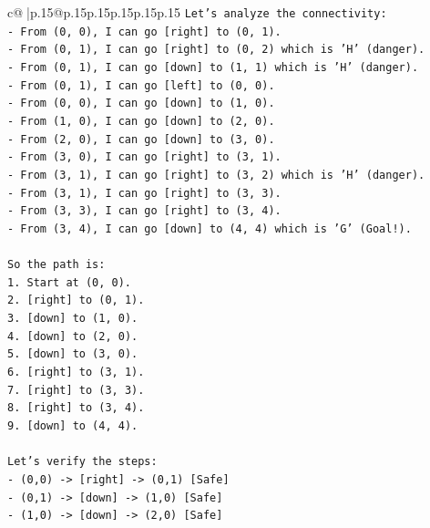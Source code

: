 \documentclass{article}
\begin{document}
{\begin{supertabular}{c@{$\;$}|p{.15\linewidth}@{}p{.15\linewidth}p{.15\linewidth}p{.15\linewidth}p{.15\linewidth}p{.15\linewidth}}
{{{\texttt{Let's analyze the connectivity:} \\
\texttt{{-} From (0, 0), I can go {[}right{]} to (0, 1).} \\
\texttt{{-} From (0, 1), I can go {[}right{]} to (0, 2) which is 'H' (danger).} \\
\texttt{{-} From (0, 1), I can go {[}down{]} to (1, 1) which is 'H' (danger).} \\
\texttt{{-} From (0, 1), I can go {[}left{]} to (0, 0).} \\
\texttt{{-} From (0, 0), I can go {[}down{]} to (1, 0).} \\
\texttt{{-} From (1, 0), I can go {[}down{]} to (2, 0).} \\
\texttt{{-} From (2, 0), I can go {[}down{]} to (3, 0).} \\
\texttt{{-} From (3, 0), I can go {[}right{]} to (3, 1).} \\
\texttt{{-} From (3, 1), I can go {[}right{]} to (3, 2) which is 'H' (danger).} \\
\texttt{{-} From (3, 1), I can go {[}right{]} to (3, 3).} \\
\texttt{{-} From (3, 3), I can go {[}right{]} to (3, 4).} \\
\texttt{{-} From (3, 4), I can go {[}down{]} to (4, 4) which is 'G' (Goal!).} \\
\\ 
\texttt{So the path is:} \\
\texttt{1. Start at (0, 0).} \\
\texttt{2. {[}right{]} to (0, 1).} \\
\texttt{3. {[}down{]} to (1, 0).} \\
\texttt{4. {[}down{]} to (2, 0).} \\
\texttt{5. {[}down{]} to (3, 0).} \\
\texttt{6. {[}right{]} to (3, 1).} \\
\texttt{7. {[}right{]} to (3, 3).} \\
\texttt{8. {[}right{]} to (3, 4).} \\
\texttt{9. {[}down{]} to (4, 4).} \\
\\ 
\texttt{Let's verify the steps:} \\
\texttt{{-} (0,0) {-}> {[}right{]} {-}> (0,1) {[}Safe{]}} \\
\texttt{{-} (0,1) {-}> {[}down{]} {-}> (1,0) {[}Safe{]}} \\
\texttt{{-} (1,0) {-}> {[}down{]} {-}> (2,0) {[}Safe{]}} \\
}}}
\end{supertabular}}
\end{document}
